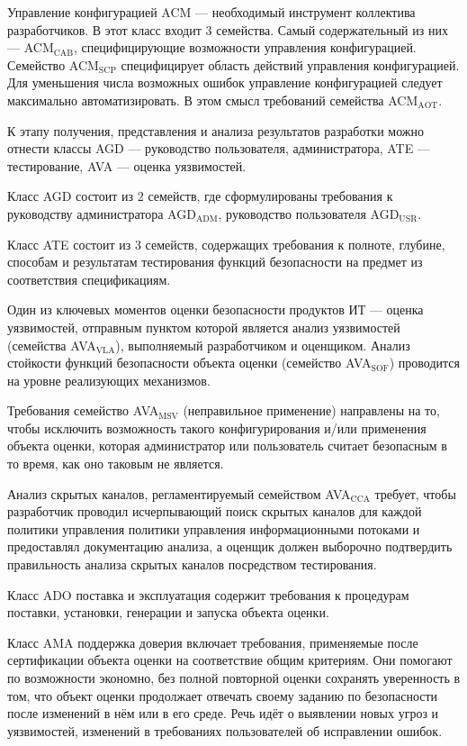 \documentclass[12pt, russian, oneside, article]{ncc}
\begin{document}
Управление конфигурацией ACM --- необходимый инструмент коллектива разработчиков. В этот класс входит 3 семейства. Самый содержательный из них --- ACM$_{\mathrm{CAB}}$, специфицирующие возможности управления конфигурацией. Семейство ACM$_{\mathrm{SCP}}$ специфицирует область действий управления конфигурацией. Для уменьшения числа возможных ошибок управление конфигурацией следует максимально автоматизировать. В этом смысл требований семейства ACM$_{\mathrm{AOT}}$.

К этапу получения, представления и анализа результатов разработки можно отнести классы AGD --- руководство пользователя, администратора, ATE --- тестирование, AVA --- оценка уязвимостей.

Класс AGD состоит из 2 семейств, где сформулированы требования к руководству администратора AGD$_{\mathrm{ADM}}$, руководство пользователя AGD$_{\mathrm{USR}}$.

Класс ATE состоит из 3 семейств, содержащих требования к полноте, глубине, способам и результатам тестирования функций безопасности на предмет из соответствия спецификациям.

Один из ключевых моментов оценки безопасности продуктов ИТ --- оценка уязвимостей, отправным пунктом которой является анализ уязвимостей (семейства AVA$_{\mathrm{VLA}}$), выполняемый разработчиком и оценщиком. Анализ стойкости функций безопасности объекта оценки (семейство AVA$_{\mathrm{SOF}}$) проводится на уровне реализующих механизмов.

Требования семейство AVA$_{\mathrm{MSV}}$ (неправильное применение) направлены на то, чтобы исключить возможность такого конфигурирования и/или применения объекта оценки, которая администратор или пользователь считает безопасным в то время, как оно таковым не является.

Анализ скрытых каналов, регламентируемый семейством AVA$_{\mathrm{CCA}}$ требует, чтобы разработчик проводил исчерпывающий поиск скрытых каналов для каждой политики управления политики управления информационными потоками и предоставлял документацию анализа, а оценщик должен выборочно подтвердить правильность анализа скрытых каналов посредством тестирования.

Класс ADO поставка и эксплуатация содержит требования к процедурам поставки, установки, генерации и запуска объекта оценки.

Класс AMA поддержка доверия включает требования, применяемые после сертификации объекта оценки на соответствие общим критериям. Они помогают по возможности экономно, без полной повторной оценки сохранять уверенность в том, что объект оценки продолжает отвечать своему заданию по безопасности после изменений в нём или в его среде. Речь идёт о выявлении новых угроз и уязвимостей, изменений в требованиях пользователей об исправлении ошибок.
\end{document}
